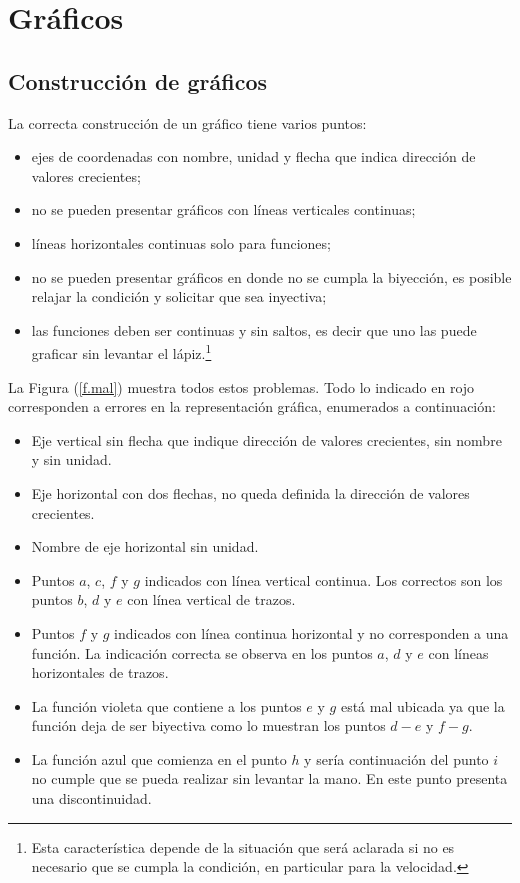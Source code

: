 \appendix
\chapter{Gráficos}

\section{Construcción de gráficos}
\label{c.graf}

La correcta construcción de un gráfico tiene varios puntos: 
\begin{itemize}
  \item ejes de coordenadas con nombre, unidad y flecha que indica dirección
    de valores crecientes;
  \item no se pueden presentar gráficos con líneas verticales continuas;
  \item líneas horizontales continuas solo para funciones; 
  \item no se pueden presentar gráficos en donde no se cumpla la biyección, es
    posible relajar la condición y solicitar que sea inyectiva;
  \item las funciones deben ser continuas y sin saltos, es decir que uno las
    puede graficar sin levantar el lápiz.\footnote{Esta característica depende
    de la situación que será aclarada si no es necesario que se cumpla la
    condición, en particular para la velocidad.}
\end{itemize}
La Figura (\ref{f.mal}) muestra todos estos problemas. Todo lo indicado en
{\color{red}rojo} corresponden a errores en la representación gráfica,
enumerados a continuación:
\begin{itemize}
  \item Eje vertical sin flecha que indique dirección de valores crecientes, sin
    nombre y sin unidad.
  \item Eje horizontal con dos flechas, no queda definida la dirección de
    valores crecientes.
  \item Nombre de eje horizontal sin unidad.
  \item Puntos $a$, $c$, $f$ y $g$ indicados con línea vertical continua. Los
    correctos son los puntos $b$, $d$ y $e$ con línea vertical de trazos.
  \item Puntos $f$ y $g$ indicados con línea continua horizontal y no
    corresponden a una función. La indicación correcta se observa en los puntos
    $a$, $d$ y $e$ con líneas horizontales de trazos.
  \item La función violeta que contiene a los puntos $e$ y $g$ está mal ubicada
    ya que la función deja de ser biyectiva como lo muestran los puntos $d-e$ y
    $f-g$.
  \item La función azul que comienza en el punto $h$ y sería continuación del
    punto $i$ no cumple que se pueda realizar sin levantar la mano. En este
    punto presenta una discontinuidad.
\end{itemize}

